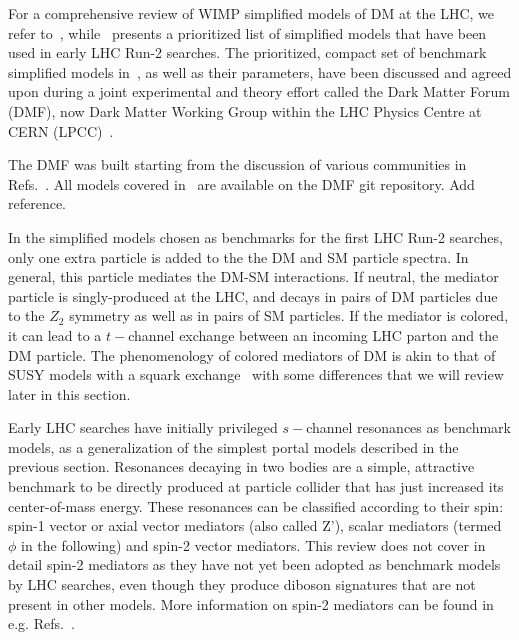 For a comprehensive review of WIMP simplified models of DM at the LHC, we refer to~\cite{Arcadi:2017kky}, while~\cite{Abercrombie:2015wmb} presents a prioritized list of simplified models that have been used in early LHC Run-2 searches. The prioritized, compact set of benchmark simplified models in~\cite{Abercrombie:2015wmb}, as well as their parameters, have been discussed and agreed upon during a joint experimental and theory effort called the Dark Matter Forum (DMF), now Dark Matter Working Group within the LHC Physics Centre at CERN (LPCC)~\cite{DMWG}. 

\begin{marginnote}[]
The DMF was built starting from the discussion of various communities in Refs.~\cite{Yavin:14092893,Malik:2014ggr,Abdallah:2015ter}. All models covered in~\cite{Abercrombie:2015wmb} are available on the DMF git repository. Add reference. 
\end{marginnote}

In the simplified models chosen as benchmarks for the first LHC Run-2 searches, only one extra particle is added to the the DM and SM particle spectra. In general, this particle mediates the DM-SM interactions. If neutral, the mediator particle is singly-produced at the LHC, and decays in pairs of DM particles due to the $Z_2$ symmetry as well as in pairs of SM particles. If the mediator is colored, it can lead to a $t-$channel exchange between an incoming LHC parton and the DM particle. The phenomenology of colored mediators of DM is akin to that of SUSY models with a squark exchange~\cite{Papucci:2014iwa,An:2013xka,Bell:2012rg} with some differences that we will review later in this section. 

Early LHC searches have initially privileged $s-$channel resonances as benchmark models, as a generalization of the simplest portal models described in the previous section. Resonances decaying in two bodies
are a simple, attractive benchmark to be directly produced at particle collider that has just increased its center-of-mass energy. These resonances can be classified according to their spin: spin-1 vector or axial vector mediators (also called Z'), scalar mediators (termed $\phi$ in the following) and spin-2 vector mediators. This review does not cover in detail spin-2 mediators as they have not yet been adopted as benchmark models by LHC searches, even though they produce diboson signatures that are not present in other models. More information on spin-2 mediators can be found in e.g. Refs.~\cite{Kraml:2017atm,Han:2015cty}.

